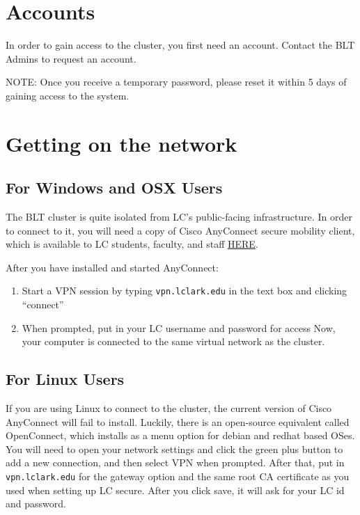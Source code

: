\documentclass[]{book}
\providecommand{\tightlist}{%
  \setlength{\itemsep}{0pt}\setlength{\parskip}{0pt}}
\begin{document}
\section{Accounts}\label{accounts}

In order to gain access to the cluster, you first need an account.
Contact the BLT Admins to request an account.

NOTE: Once you receive a temporary password, please reset it within 5
days of gaining access to the system.

\section{Getting on the network}\label{getting-on-the-network}

\subsection{For Windows and OSX Users}\label{for-windows-and-osx-users}

The BLT cluster is quite isolated from LC's public-facing
infrastructure. In order to connect to it, you will need a copy of Cisco
AnyConnect secure mobility client, which is available to LC students,
faculty, and staff \href{https://vpn.lclark.edu}{HERE}.

After you have installed and started AnyConnect:

\begin{enumerate}
\def\labelenumi{\arabic{enumi}.}
\tightlist
\item
  Start a VPN session by typing \texttt{vpn.lclark.edu} in the text box
  and clicking ``connect''
\item
  When prompted, put in your LC username and password for access Now,
  your computer is connected to the same virtual network as the cluster.
\end{enumerate}

\subsection{For Linux Users}\label{for-linux-users}

If you are using Linux to connect to the cluster, the current version of
Cisco AnyConnect will fail to install. Luckily, there is an open-source
equivalent called OpenConnect, which installs as a menu option for
debian and redhat based OSes. You will need to open your network
settings and click the green plus button to add a new connection, and
then select VPN when prompted. After that, put in
\texttt{vpn.lclark.edu} for the gateway option and the same root CA
certificate as you used when setting up LC secure. After you click save,
it will ask for your LC id and password.
\end{document}
